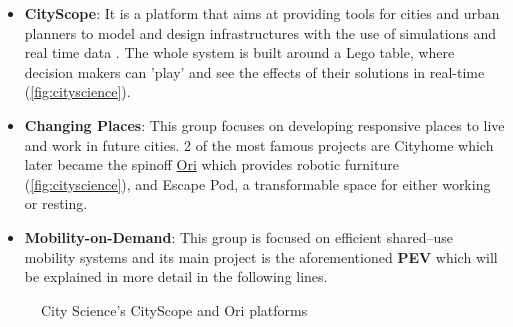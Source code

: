 \begin{itemize}

  \item \textbf{CityScope}: It is a platform that aims at providing tools for cities and urban planners to model and design infrastructures with the use of simulations and real time data . The whole system is built around a Lego table, where decision makers can 'play' and see the effects of their solutions in real-time (\autoref{fig:cityscience}).

  \item \textbf{Changing Places}: This group focuses on developing responsive places to live and work in future cities. 2 of the most famous projects are Cityhome which later became the spinoff \href{https://www.orisystems.com/}{Ori} which provides robotic furniture (\autoref{fig:cityscience}), and Escape Pod, a transformable space for either working or resting.

  \item \textbf{Mobility-on-Demand}: This group is focused on efficient shared--use mobility systems and its main project is the aforementioned \textbf{PEV} which will be explained in more detail in the following lines.

\end{itemize}

\begin{figure}[ht]
  \centering
   \quad
  \caption{City Science's CityScope and Ori platforms}
  \label{fig:cityscience}
\end{figure} 

